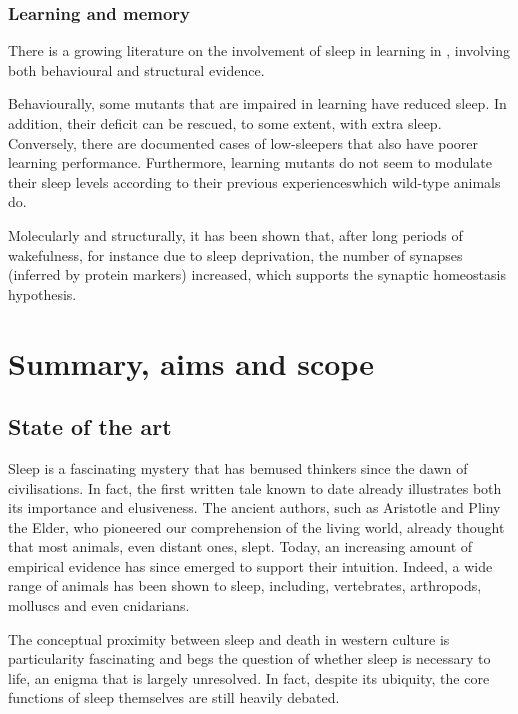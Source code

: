\subsubsection{Learning and memory}
There is a growing literature on the involvement of sleep in learning in \droso, involving both behavioural and structural evidence.

Behaviourally, some mutants that are impaired in learning have reduced sleep\cite{liu_amnesiac_2008}.
In addition, their deficit can be rescued, to some extent, with extra sleep\cite{dissel_sleep_2015,dissel_enhanced_2017}.
Conversely, there are documented cases of low-sleepers that also have poorer learning performance\cite{bushey_drosophila_2007,seugnet_d1_2008,glou_circadian_2012}.
Furthermore, learning mutants do not seem to modulate their sleep levels according to their previous experiences\cite{ganguly-fitzgerald_waking_2006}\emd{}which wild-type animals do\cite{bushey_sleep_2011}.

Molecularly and structurally,
it has been shown that, after long periods of wakefulness, for instance due to sleep deprivation, the number of synapses (inferred by protein markers) increased, which supports the synaptic homeostasis hypothesis\cite{gilestro_widespread_2009,bushey_sleep_2011}.



\clearpage
\section{Summary, aims and scope}

\subsection{State of the art}

Sleep is a fascinating mystery that has bemused thinkers since the dawn of civilisations.
In fact, the first written tale known to date already illustrates both its importance and elusiveness.
The ancient authors, such as Aristotle and Pliny the Elder, who pioneered our comprehension of the living world, already thought that most animals, even distant ones, slept.
Today, an increasing amount of empirical evidence has since emerged to support their intuition.
Indeed, a wide range of animals has been shown to sleep, including, vertebrates, arthropods, molluscs and even cnidarians.

The conceptual proximity between sleep and death in western culture is particularity fascinating
and begs the question of whether sleep is necessary to life, an enigma that is largely unresolved. 
In fact, despite its ubiquity, the core functions of sleep themselves are still heavily debated.

